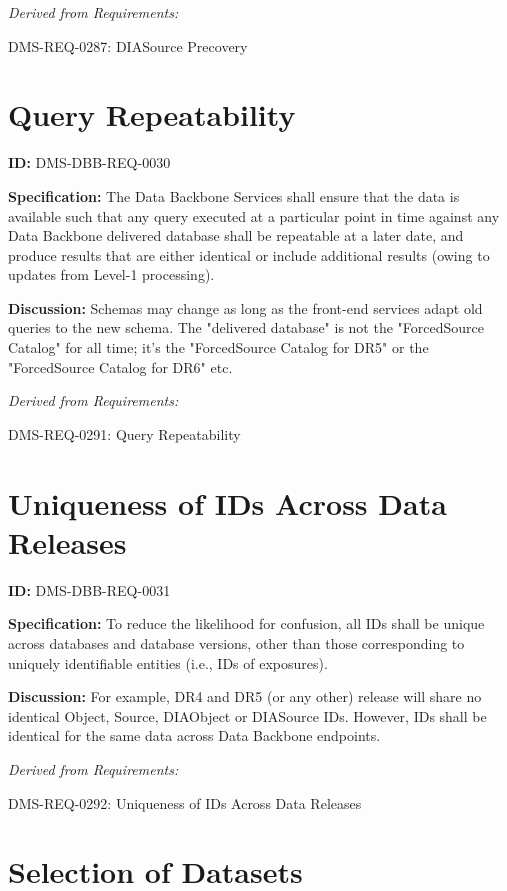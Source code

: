 \documentclass[SE,toc,lsstdraft]{lsstdoc}
\begin{document}
\emph{Derived from Requirements:}

DMS-REQ-0287:
DIASource Precovery \newline

\section{Query Repeatability}

\label{DMS-DBB-REQ-0030}
\textbf{ID:} DMS-DBB-REQ-0030

\textbf{Specification:}
The Data Backbone Services shall ensure that the data is available such that any query executed at a particular point in time against any Data Backbone delivered database shall be repeatable at a later date, and produce results that are either identical or include additional results (owing to updates from Level-1 processing).

\textbf{Discussion:}
Schemas may change as long as the front-end services adapt old queries to the new schema.   The "delivered database" is not the "ForcedSource Catalog" for all time; it's the "ForcedSource Catalog for DR5" or the "ForcedSource Catalog for DR6" etc.

\emph{Derived from Requirements:}

DMS-REQ-0291:
Query Repeatability \newline

\section{Uniqueness of IDs Across Data Releases}

\label{DMS-DBB-REQ-0031}
\textbf{ID:} DMS-DBB-REQ-0031

\textbf{Specification:}
To reduce the likelihood for confusion, all IDs shall be unique across databases and database versions, other than those corresponding to uniquely identifiable entities (i.e., IDs of exposures).

\textbf{Discussion:}
For example, DR4 and DR5 (or any other) release will share no identical Object, Source, DIAObject or DIASource IDs.    However, IDs shall be identical for the same data across Data Backbone endpoints.

\emph{Derived from Requirements:}

DMS-REQ-0292:
Uniqueness of IDs Across Data Releases \newline

\section{Selection of Datasets}
\end{document}
